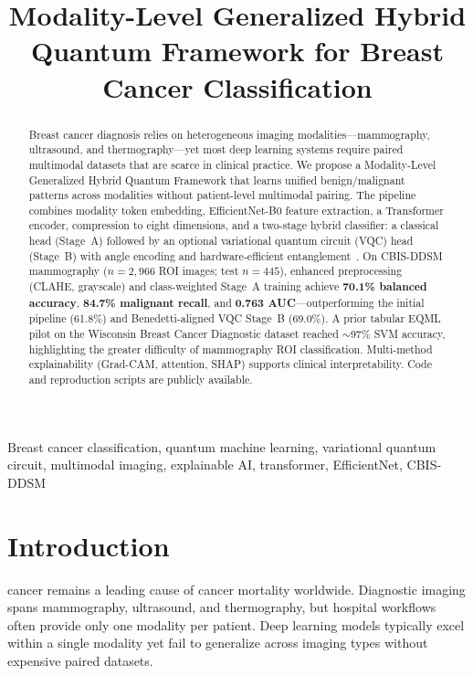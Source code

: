 \documentclass[journal]{IEEEtran}
\begin{document}
\title{Modality-Level Generalized Hybrid Quantum Framework for Breast Cancer Classification}

\author{
}

\maketitle

\begin{abstract}
Breast cancer diagnosis relies on heterogeneous imaging modalities---mammography, ultrasound, and thermography---yet most deep learning systems require paired multimodal datasets that are scarce in clinical practice. We propose a Modality-Level Generalized Hybrid Quantum Framework that learns unified benign/malignant patterns across modalities without patient-level multimodal pairing. The pipeline combines modality token embedding, EfficientNet-B0 feature extraction, a Transformer encoder, compression to eight dimensions, and a two-stage hybrid classifier: a classical head (Stage~A) followed by an optional variational quantum circuit (VQC) head (Stage~B) with angle encoding and hardware-efficient entanglement~\cite{benedetti2019vqc}. On CBIS-DDSM mammography ($n=2{,}966$ ROI images; test $n=445$), enhanced preprocessing (CLAHE, grayscale) and class-weighted Stage~A training achieve \textbf{70.1\% balanced accuracy}, \textbf{84.7\% malignant recall}, and \textbf{0.763 AUC}---outperforming the initial pipeline (61.8\%) and Benedetti-aligned VQC Stage~B (69.0\%). A prior tabular EQML pilot on the Wisconsin Breast Cancer Diagnostic dataset reached $\sim$97\% SVM accuracy, highlighting the greater difficulty of mammography ROI classification. Multi-method explainability (Grad-CAM, attention, SHAP) supports clinical interpretability. Code and reproduction scripts are publicly available.
\end{abstract}

\begin{IEEEkeywords}
Breast cancer classification, quantum machine learning, variational quantum circuit, multimodal imaging, explainable AI, transformer, EfficientNet, CBIS-DDSM
\end{IEEEkeywords}

\section{Introduction}
 cancer remains a leading cause of cancer mortality worldwide. Diagnostic imaging spans mammography, ultrasound, and thermography, but hospital workflows often provide only one modality per patient. Deep learning models typically excel within a single modality yet fail to generalize across imaging types without expensive paired datasets.
\end{document}
